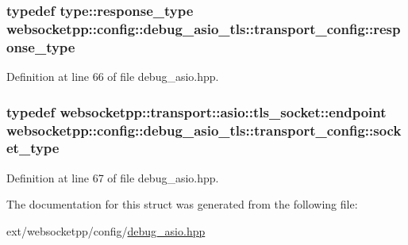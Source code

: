 \subsubsection[{response\+\_\+type}]{\setlength{\rightskip}{0pt plus 5cm}typedef {\bf type\+::response\+\_\+type} {\bf websocketpp\+::config\+::debug\+\_\+asio\+\_\+tls\+::transport\+\_\+config\+::response\+\_\+type}}\label{structwebsocketpp_1_1config_1_1debug__asio__tls_1_1transport__config_ac70bda525dfbcd7b8e631aa2397bbcfe}


Definition at line 66 of file debug\+\_\+asio.\+hpp.

\hypertarget{structwebsocketpp_1_1config_1_1debug__asio__tls_1_1transport__config_a3d3916ddd31f98910ec974518f1c1c90}{}
\subsubsection[{socket\+\_\+type}]{\setlength{\rightskip}{0pt plus 5cm}typedef {\bf websocketpp\+::transport\+::asio\+::tls\+\_\+socket\+::endpoint} {\bf websocketpp\+::config\+::debug\+\_\+asio\+\_\+tls\+::transport\+\_\+config\+::socket\+\_\+type}}\label{structwebsocketpp_1_1config_1_1debug__asio__tls_1_1transport__config_a3d3916ddd31f98910ec974518f1c1c90}


Definition at line 67 of file debug\+\_\+asio.\+hpp.



The documentation for this struct was generated from the following file\+:\begin{DoxyCompactItemize}
\item 
ext/websocketpp/config/\hyperlink{debug__asio_8hpp}{debug\+\_\+asio.\+hpp}\end{DoxyCompactItemize}
